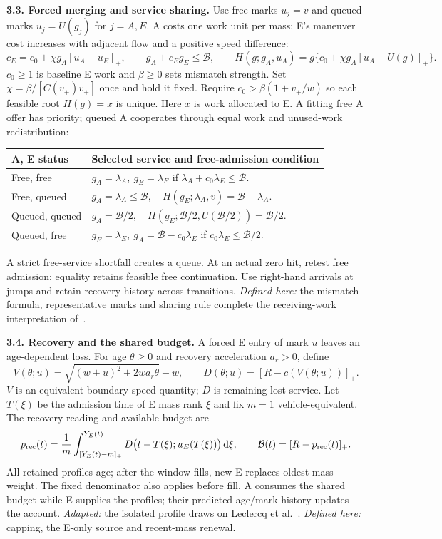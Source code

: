 \documentclass[10pt,a4paper]{article}
\newcommand{\pos}[1]{[#1]_+}
\newcommand{\bud}{\mathcal B}
\newcommand{\dd}{\,\mathrm d}
\begin{document}
\newpage
\textbf{3.3. Forced merging and service sharing.}
Use free marks $u_j=v$ and queued marks $u_j=U(g_j)$ for $j=A,E$.
A costs one work unit per mass; E's maneuver cost increases with adjacent
flow and a positive speed difference:
\begin{equation}
 c_E=c_0+\chi g_A\pos{u_A-u_E},\qquad
 g_A+c_Eg_E\leq\bud,\qquad
 H(g;g_A,u_A)=g\{c_0+\chi g_A\pos{u_A-U(g)}\}.
 \label{eq:work}
\end{equation}
$c_0\geq1$ is baseline E work and $\beta\geq0$ sets mismatch strength.
Set $\chi=\beta/[C(v_+)v_+]$ once and hold it fixed.
Require $c_0>\beta(1+v_+/w)$ so each feasible root $H(g)=x$
is unique. Here $x$ is work allocated to E. A fitting free A offer has
priority; queued A cooperates through equal work and unused-work redistribution:
\begin{center}
\setlength{\tabcolsep}{5pt}
\begin{tabular}{@{}ll@{}}
\toprule
A, E status & Selected service and free-admission condition\\
\midrule
Free, free & $g_A=\lambda_A,\ g_E=\lambda_E$ if
$\lambda_A+c_0\lambda_E\leq\bud$.\\
Free, queued & $g_A=\lambda_A\leq\bud,\quad
H(g_E;\lambda_A,v)=\bud-\lambda_A$.\\
Queued, queued & $g_A=\bud/2,\quad
H(g_E;\bud/2,U(\bud/2))=\bud/2$.\\
Queued, free & $g_E=\lambda_E,\ g_A=\bud-c_0\lambda_E$ if
$c_0\lambda_E\leq\bud/2$.\\
\bottomrule
\end{tabular}
\end{center}
A strict free-service shortfall creates a queue. At an actual zero hit,
retest free admission; equality retains feasible free continuation. Use
right-hand arrivals at jumps and retain recovery history across transitions.
\emph{Defined here:} the mismatch formula, representative marks and sharing
rule complete the receiving-work interpretation of~\cite{carey}.

\textbf{3.4. Recovery and the shared budget.}
A forced E entry of mark $u$ leaves an age-dependent loss. For age
$\theta\geq0$ and recovery acceleration $a_r>0$, define
\begin{equation}
 V(\theta;u)=\sqrt{(w+u)^2+2wa_r\theta}-w,\qquad
 D(\theta;u)=\pos{R-c(V(\theta;u))}.
 \label{eq:profile}
\end{equation}
$V$ is an equivalent boundary-speed quantity; $D$ is remaining lost service.
Let $T(\xi)$ be the admission time of E mass rank $\xi$ and fix
$m=1$ vehicle-equivalent. The recovery reading and available budget are
\begin{equation}
 p_{\rm rec}(t)=\frac1m\int_{\pos{Y_E(t)-m}}^{Y_E(t)}
 D\bigl(t-T(\xi);u_E(T(\xi))\bigr)\dd\xi,\qquad
 \bud(t)=\pos{R-p_{\rm rec}(t)}.
 \label{eq:recovery}
\end{equation}
All retained profiles age; after the window fills, new E replaces oldest
mass weight. The fixed denominator also applies before fill. A consumes the
shared budget while E supplies the profiles; their predicted age/mark history
updates the account. \emph{Adapted:} the isolated profile draws on
Leclercq et al.~\cite{leclercq}. \emph{Defined here:} capping, the E-only
source and recent-mass renewal.
\end{document}
